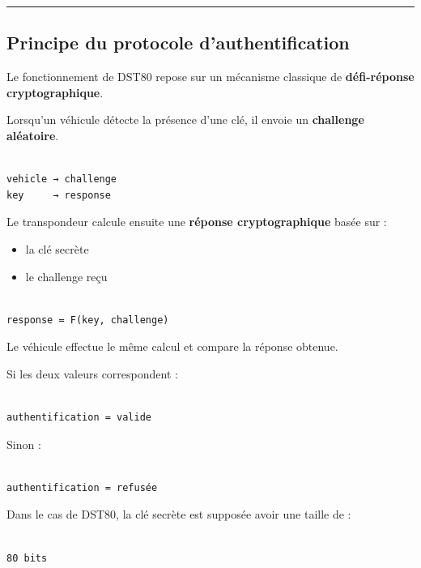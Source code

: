 \documentclass[
  french,
]{article}
\providecommand{\tightlist}{%
  \setlength{\itemsep}{0pt}\setlength{\parskip}{0pt}}
\begin{document}
\begin{center}\rule{0.5\linewidth}{0.5pt}\end{center}

\subsection{Principe du protocole
d'authentification}\label{principe-du-protocole-dauthentification}

Le fonctionnement de DST80 repose sur un mécanisme classique de
\textbf{défi-réponse cryptographique}.

Lorsqu'un véhicule détecte la présence d'une clé, il envoie un
\textbf{challenge aléatoire}.

\begin{verbatim}

vehicle → challenge
key     → response
\end{verbatim}

Le transpondeur calcule ensuite une \textbf{réponse cryptographique}
basée sur :

\begin{itemize}
\tightlist
\item
  la clé secrète
\item
  le challenge reçu
\end{itemize}

\begin{verbatim}

response = F(key, challenge)
\end{verbatim}

Le véhicule effectue le même calcul et compare la réponse obtenue.

Si les deux valeurs correspondent :

\begin{verbatim}

authentification = valide
\end{verbatim}

Sinon :

\begin{verbatim}

authentification = refusée
\end{verbatim}

Dans le cas de DST80, la clé secrète est supposée avoir une taille de :

\begin{verbatim}

80 bits
\end{verbatim}
\end{document}
